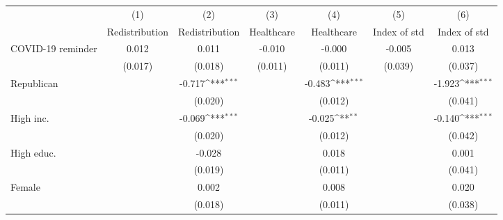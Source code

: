 {
\def\sym#1{\ifmmode^{#1}\else\(^{#1}\)\fi}
\begin{tabular}{l*{6}{c}}
\toprule
                    &\multicolumn{1}{c}{(1)}&\multicolumn{1}{c}{(2)}&\multicolumn{1}{c}{(3)}&\multicolumn{1}{c}{(4)}&\multicolumn{1}{c}{(5)}&\multicolumn{1}{c}{(6)}\\
                    &\multicolumn{1}{c}{Redistribution}&\multicolumn{1}{c}{Redistribution}&\multicolumn{1}{c}{Healthcare}&\multicolumn{1}{c}{Healthcare}&\multicolumn{1}{c}{Index of std}&\multicolumn{1}{c}{Index of std}\\
\midrule
COVID-19 reminder   &       0.012         &       0.011         &      -0.010         &      -0.000         &      -0.005         &       0.013         \\
                    &     (0.017)         &     (0.018)         &     (0.011)         &     (0.011)         &     (0.039)         &     (0.037)         \\
\addlinespace
Republican          &                     &      -0.717\sym{***}&                     &      -0.483\sym{***}&                     &      -1.923\sym{***}\\
                    &                     &     (0.020)         &                     &     (0.012)         &                     &     (0.041)         \\
\addlinespace
High inc.           &                     &      -0.069\sym{***}&                     &      -0.025\sym{**} &                     &      -0.140\sym{***}\\
                    &                     &     (0.020)         &                     &     (0.012)         &                     &     (0.042)         \\
\addlinespace
High educ.          &                     &      -0.028         &                     &       0.018         &                     &       0.001         \\
                    &                     &     (0.019)         &                     &     (0.011)         &                     &     (0.041)         \\
\addlinespace
Female              &                     &       0.002         &                     &       0.008         &                     &       0.020         \\
                    &                     &     (0.018)         &                     &     (0.011)         &                     &     (0.038)         \\

\end{tabular}}
